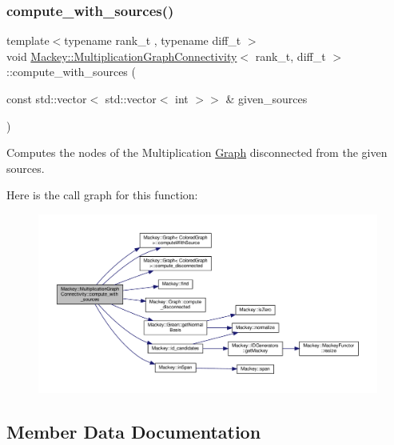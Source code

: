 \subsubsection{\texorpdfstring{compute\+\_\+with\+\_\+sources()}{compute\_with\_sources()}}
{\footnotesize\ttfamily template$<$typename rank\+\_\+t , typename diff\+\_\+t $>$ \\
void \hyperlink{classMackey_1_1MultiplicationGraphConnectivity}{Mackey\+::\+Multiplication\+Graph\+Connectivity}$<$ rank\+\_\+t, diff\+\_\+t $>$\+::compute\+\_\+with\+\_\+sources (\begin{DoxyParamCaption}\item[{const std\+::vector$<$ std\+::vector$<$ int $>$$>$ \&}]{given\+\_\+sources }\end{DoxyParamCaption})}



Computes the nodes of the Multiplication \hyperlink{classMackey_1_1Graph}{Graph} disconnected from the given sources. 

Here is the call graph for this function\+:\nopagebreak
\begin{figure}[H]
\begin{center}
\leavevmode
\includegraphics[width=350pt]{classMackey_1_1MultiplicationGraphConnectivity_a81e8f3efb867ea951573a2a5ca5825ed_cgraph}
\end{center}
\end{figure}


\subsection{Member Data Documentation}
\mbox{\label{classMackey_1_1MultiplicationGraphConnectivity_a4f13de641c34260697b086a9e0a559e9}} 

